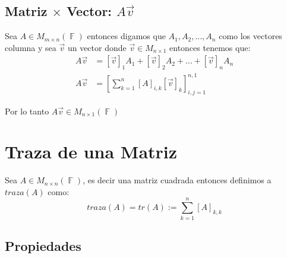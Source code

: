 \documentclass[12pt, fleqn]{report}                             %
\theoremstyle{break}                                            %
\DeclareMathOperator \GenericField {\mathbb{F}}                 %
\newcommand{\Brackets}[1]    {\left[ #1 \right]}                %
\begin{document}
            \clearpage
            \subsection{Matriz $\times$ Vector: $A\vec{v}$}
                
                Sea $A \in M_{m \times n}(\GenericField)$ entonces digamos que $A_1, A_2, \dots, A_n$
                como los vectores columna y sea $\vec{v}$ un vector donde $\vec{v} \in M_{n \times 1}$
                entonces tenemos que:
                \begin{align*}
                    A\vec{v} &= [\vec{v}]_1 A_1 + [\vec{v}]_2 A_2 + \dots + [\vec{v}]_n A_n             \\
                    A\vec{v} &= \Brackets{ \sum_{k=1}^{n} [A]_{i, k} [\vec{v}]_k }_{i, j = 1}^{n, 1}
                \end{align*}

                Por lo tanto $A\vec{v} \in M_{n \times 1}(\GenericField)$



        \clearpage
        \section{Traza de una Matriz}

            Sea $A \in M_{n \times n}(\GenericField)$, es decir una matriz cuadrada entonces
            definimos a $traza(A)$ como:
            \begin{equation*}
                traza(A) 
                    = tr(A)
                    := \sum_{k = 1}^n [A]_{k, k}
            \end{equation*}


            \subsection{Propiedades}
\end{document}
